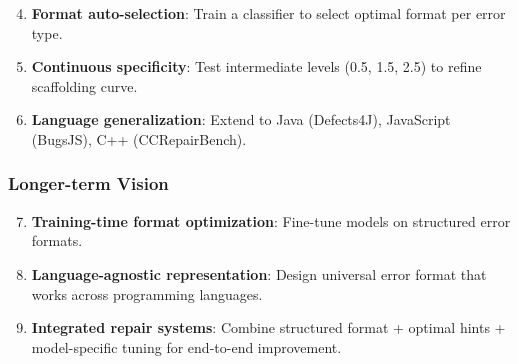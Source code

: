 \begin{enumerate}
    \setcounter{enumi}{3}
    \item \textbf{Format auto-selection}: Train a classifier to select optimal format per error type.
    \item \textbf{Continuous specificity}: Test intermediate levels (0.5, 1.5, 2.5) to refine scaffolding curve.
    \item \textbf{Language generalization}: Extend to Java (Defects4J), JavaScript (BugsJS), C++ (CCRepairBench).
\end{enumerate}

\subsubsection{Longer-term Vision}

\begin{enumerate}
    \setcounter{enumi}{6}
    \item \textbf{Training-time format optimization}: Fine-tune models on structured error formats.
    \item \textbf{Language-agnostic representation}: Design universal error format that works across programming languages.
    \item \textbf{Integrated repair systems}: Combine structured format + optimal hints + model-specific tuning for end-to-end improvement.
\end{enumerate}
